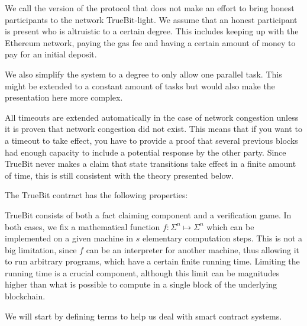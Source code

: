 \documentclass[11pt,letterpaper]{article}
\begin{document}
We call the version of the protocol that does not make an effort to bring honest participants to the network TrueBit-light.
We assume that an honest participant is present who is altruistic to a certain degree. This includes keeping up
with the Ethereum network, paying the gas fee and having a certain amount of money to pay for an initial deposit.

We also simplify the system to a degree to only allow one parallel task. This might be extended to a constant amount
of tasks but would also make the presentation here more complex.

All timeouts are extended automatically in the case of network congestion unless it is proven that network congestion did not exist. This means that if you want
to a timeout to take effect, you have to provide a proof that several previous blocks had enough capacity to
include a potential response by the other party. Since TrueBit never makes a claim that state transitions take effect
in a finite amount of time, this is still consistent with the theory presented below.

The TrueBit contract has the following properties:

TrueBit consists of both a fact claiming component and a verification game. In both cases, we fix a mathematical function
$f \colon \Sigma^n \mapsto \Sigma^n$ which can be implemented on a given machine in $s$ elementary computation steps.
This is not a big limitation, since $f$ can be an interpreter for another machine, thus allowing it to run arbitrary programs,
which have a certain finite running time. Limiting the running time is a crucial component, although this limit can be
magnitudes higher than what is possible to compute in a single block of the underlying blockchain.

We will start by defining terms to help us deal with smart contract systems.
\end{document}
